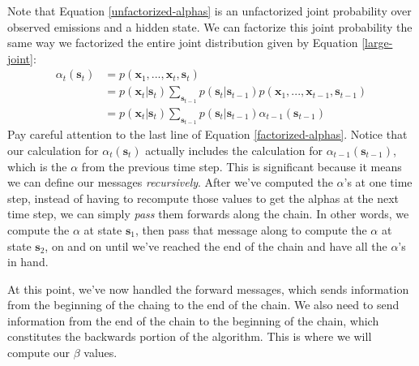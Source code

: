Note that Equation \ref{unfactorized-alphas} is an unfactorized joint probability over observed emissions and a hidden state. We can factorize this joint probability the same way we factorized the entire joint distribution given by Equation \ref{large-joint}:
\begin{align} \label{factorized-alphas}
	\alpha_t(\textbf{s}_t) &= p(\textbf{x}_1, ..., \textbf{x}_t, \textbf{s}_t) \\
	&= p(\textbf{x}_t | \textbf{s}_t) \sum_{\textbf{s}_{t-1}} p(\textbf{s}_t | \textbf{s}_{t-1}) p(\textbf{x}_1, ..., \textbf{x}_{t-1}, \textbf{s}_{t-1}) \\
	&= p(\textbf{x}_t | \textbf{s}_t) \sum_{\textbf{s}_{t-1}} p(\textbf{s}_t | \textbf{s}_{t-1}) \alpha_{t-1}(\textbf{s}_{t-1})
\end{align}
Pay careful attention to the last line of Equation \ref{factorized-alphas}. Notice that our calculation for $\alpha_t(\textbf{s}_t)$ actually includes the calculation for $\alpha_{t-1}(\textbf{s}_{t-1})$, which is the $\alpha$ from the previous time step. This is significant because it means we can define our messages \textit{recursively}. After we've computed the $\alpha$'s at one time step, instead of having to recompute those values to get the alphas at the next time step, we can simply \textit{pass} them forwards along the chain. In other words, we compute the $\alpha$ at state $\textbf{s}_1$, then pass that message along to compute the $\alpha$ at state $\textbf{s}_2$, on and on until we've reached the end of the chain and have all the $\alpha$'s in hand.

At this point, we've now handled the forward messages, which sends information from the beginning of the chaing to the end of the chain. We also need to send information from the end of the chain to the beginning of the chain, which constitutes the backwards portion of the algorithm. This is where we will compute our $\beta$ values.

